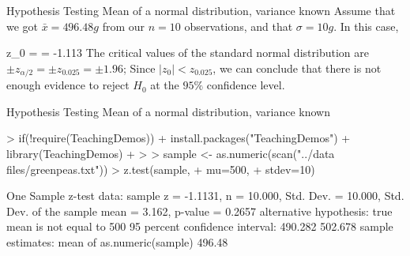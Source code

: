 \documentclass[t]{beamer}
\begin{document}

\begin{ftst}
{Hypothesis Testing}
{Mean of a normal distribution, variance known}
Assume that we got $\bar{x} = 496.48 g$ from our $n=10$ observations, and that $\sigma = 10g$. In this case,

\beqs 
z_0 =  = -1.113
\eqs
\vhalf
The critical values of the standard normal distribution are $\pm z_{\alpha/2} = \pm z_{0.025} = \pm 1.96$;
\vone
Since $|z_0|<z_{0.025}$, we can conclude that there is not enough evidence to reject $H_0$ at the $95\%$ confidence level.
\end{ftst}


\begin{ftstf}
{Hypothesis Testing}
{Mean of a normal distribution, variance known}

\begin{rcode}
> if(!require(TeachingDemos)){
+ 	install.packages("TeachingDemos")
+ 	library(TeachingDemos)
+ }
> 
> sample <- as.numeric(scan("../data files/greenpeas.txt"))
> z.test(sample,
+        mu=500,
+        stdev=10)

One Sample z-test
data:  sample
z = -1.1131, n = 10.000, Std. Dev. = 10.000, 
Std. Dev. of the sample mean = 3.162, 
p-value = 0.2657
alternative hypothesis: true mean is not equal to 500
95 percent confidence interval:
 490.282 502.678
sample estimates:
mean of as.numeric(sample) 
                    496.48 
\end{rcode}
\end{ftstf}
\end{document}
